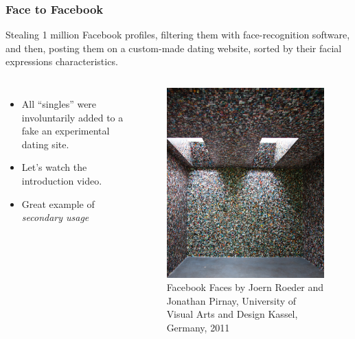 \documentclass{beamer}
\begin{document}
\begin{frame}
\frametitle{Face to Facebook}

Stealing 1 million Facebook profiles, filtering them with face-recognition software, and then,
posting them on a custom-made dating website, sorted by their facial
expressions characteristics.

\begin{columns}[c] %
    \begin{itemize}
    \item All ``singles'' were involuntarily added to a fake an
      experimental dating site.
    \item Let's watch the introduction video.
    \item Great example of \emph{secondary usage}

    \end{itemize}

    \begin{figure}
    \includegraphics[width=\textwidth,height=0.4\textheight,keepaspectratio]{img/fbFaces}
    \caption{Facebook Faces by Joern Roeder and Jonathan Pirnay,
      University of Visual Arts and Design Kassel, Germany, 2011}

    \end{figure}

    \end{columns}



\end{frame}
\end{document}
